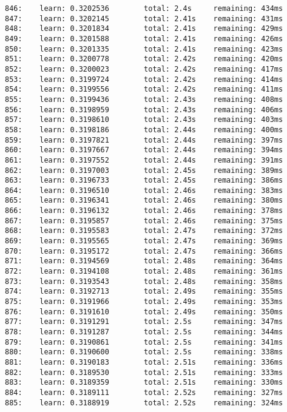 \documentclass[11pt]{article}
\begin{document}
\begin{Verbatim}[commandchars=\\\{\}]
846:    learn: 0.3202536        total: 2.4s     remaining: 434ms
847:    learn: 0.3202145        total: 2.41s    remaining: 431ms
848:    learn: 0.3201834        total: 2.41s    remaining: 429ms
849:    learn: 0.3201588        total: 2.41s    remaining: 426ms
850:    learn: 0.3201335        total: 2.41s    remaining: 423ms
851:    learn: 0.3200778        total: 2.42s    remaining: 420ms
852:    learn: 0.3200023        total: 2.42s    remaining: 417ms
853:    learn: 0.3199724        total: 2.42s    remaining: 414ms
854:    learn: 0.3199556        total: 2.42s    remaining: 411ms
855:    learn: 0.3199436        total: 2.43s    remaining: 408ms
856:    learn: 0.3198959        total: 2.43s    remaining: 406ms
857:    learn: 0.3198610        total: 2.43s    remaining: 403ms
858:    learn: 0.3198186        total: 2.44s    remaining: 400ms
859:    learn: 0.3197821        total: 2.44s    remaining: 397ms
860:    learn: 0.3197667        total: 2.44s    remaining: 394ms
861:    learn: 0.3197552        total: 2.44s    remaining: 391ms
862:    learn: 0.3197003        total: 2.45s    remaining: 389ms
863:    learn: 0.3196733        total: 2.45s    remaining: 386ms
864:    learn: 0.3196510        total: 2.46s    remaining: 383ms
865:    learn: 0.3196341        total: 2.46s    remaining: 380ms
866:    learn: 0.3196132        total: 2.46s    remaining: 378ms
867:    learn: 0.3195857        total: 2.46s    remaining: 375ms
868:    learn: 0.3195583        total: 2.47s    remaining: 372ms
869:    learn: 0.3195565        total: 2.47s    remaining: 369ms
870:    learn: 0.3195172        total: 2.47s    remaining: 366ms
871:    learn: 0.3194569        total: 2.48s    remaining: 364ms
872:    learn: 0.3194108        total: 2.48s    remaining: 361ms
873:    learn: 0.3193543        total: 2.48s    remaining: 358ms
874:    learn: 0.3192713        total: 2.49s    remaining: 355ms
875:    learn: 0.3191966        total: 2.49s    remaining: 353ms
876:    learn: 0.3191610        total: 2.49s    remaining: 350ms
877:    learn: 0.3191291        total: 2.5s     remaining: 347ms
878:    learn: 0.3191287        total: 2.5s     remaining: 344ms
879:    learn: 0.3190861        total: 2.5s     remaining: 341ms
880:    learn: 0.3190600        total: 2.5s     remaining: 338ms
881:    learn: 0.3190183        total: 2.51s    remaining: 336ms
882:    learn: 0.3189530        total: 2.51s    remaining: 333ms
883:    learn: 0.3189359        total: 2.51s    remaining: 330ms
884:    learn: 0.3189111        total: 2.52s    remaining: 327ms
885:    learn: 0.3188919        total: 2.52s    remaining: 324ms

\end{Verbatim}
\end{document}
